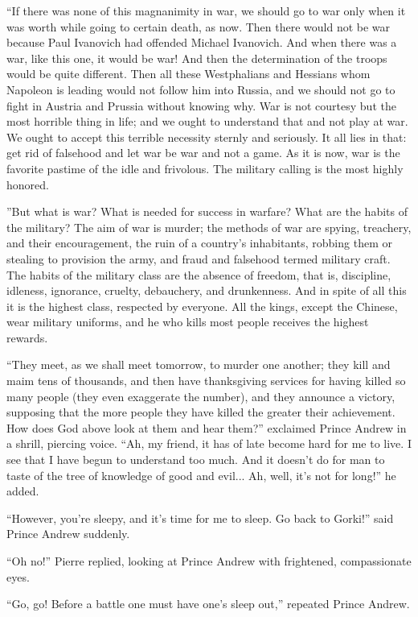 ``If there was none of this magnanimity in war, we should go to
war only when it was worth while going to certain death, as
now. Then there would not be war because Paul Ivanovich had
offended Michael Ivanovich. And when there was a war, like this
one, it would be war! And then the determination of the troops
would be quite different. Then all these Westphalians and
Hessians whom Napoleon is leading would not follow him into
Russia, and we should not go to fight in Austria and Prussia
without knowing why. War is not courtesy but the most horrible
thing in life; and we ought to understand that and not play at
war. We ought to accept this terrible necessity sternly and
seriously. It all lies in that: get rid of falsehood and let war
be war and not a game. As it is now, war is the favorite pastime
of the idle and frivolous. The military calling is the most
highly honored.

''But what is war? What is needed for success in warfare? What
are the habits of the military? The aim of war is murder; the
methods of war are spying, treachery, and their encouragement,
the ruin of a country's inhabitants, robbing them or stealing to
provision the army, and fraud and falsehood termed military
craft. The habits of the military class are the absence of
freedom, that is, discipline, idleness, ignorance, cruelty,
debauchery, and drunkenness. And in spite of all this it is the
highest class, respected by everyone. All the kings, except the
Chinese, wear military uniforms, and he who kills most people
receives the highest rewards.

``They meet, as we shall meet tomorrow, to murder one another;
they kill and maim tens of thousands, and then have thanksgiving
services for having killed so many people (they even exaggerate
the number), and they announce a victory, supposing that the more
people they have killed the greater their achievement. How does
God above look at them and hear them?'' exclaimed Prince Andrew
in a shrill, piercing voice. ``Ah, my friend, it has of late
become hard for me to live. I see that I have begun to understand
too much. And it doesn't do for man to taste of the tree of
knowledge of good and evil... Ah, well, it's not for long!'' he
added.

``However, you're sleepy, and it's time for me to sleep. Go back
to Gorki!'' said Prince Andrew suddenly.

``Oh no!'' Pierre replied, looking at Prince Andrew with
frightened, compassionate eyes.

``Go, go! Before a battle one must have one's sleep out,''
repeated Prince Andrew.

